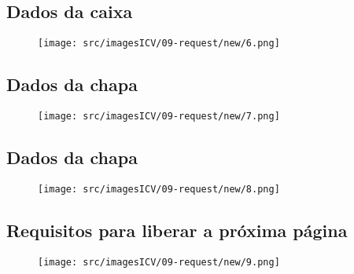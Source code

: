 \thispagestyle{fancy}
\vspace{\fill}
\subsection{\small Dados da caixa}
\begin{figure}
    \centering
    \texttt{[image: src/imagesICV/09-request/new/6.png]}
\end{figure}
\newpage

\thispagestyle{fancy}
\vspace{\fill}
\subsection{\small Dados da chapa}
\begin{figure}
    \centering
    \texttt{[image: src/imagesICV/09-request/new/7.png]}
\end{figure}
\newpage

\thispagestyle{fancy}
\vspace{\fill}
\subsection{\small Dados da chapa}
\begin{figure}
    \centering
    \texttt{[image: src/imagesICV/09-request/new/8.png]}
\end{figure}
\newpage

\thispagestyle{fancy}
\vspace{\fill}
\subsection{\small Requisitos para liberar a próxima página}
\begin{figure}
    \centering
    \texttt{[image: src/imagesICV/09-request/new/9.png]}
\end{figure}
